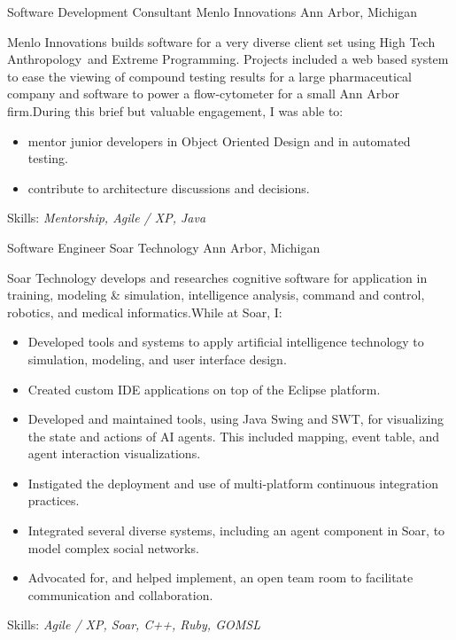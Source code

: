\documentclass[11pt,letterpaper]{moderncv}
\begin{document}
  {Software Development Consultant} {Menlo Innovations} {Ann Arbor, Michigan} {} {%
  Menlo Innovations builds software for a very diverse client set using High
  Tech Anthropology\textregistered \ and Extreme Programming.  Projects
  included a web based system to ease the viewing of compound testing results
  for a large pharmaceutical company and software to power a flow-cytometer
  for a small Ann Arbor firm.\newline During this brief but valuable engagement, I
  was able to:
  \begin{itemize}
  \item mentor junior developers in Object Oriented Design and in
    automated testing.
  \item contribute to architecture discussions and decisions.
  \end{itemize}
  Skills: \emph{Mentorship, Agile / XP, Java}
}

 {Software Engineer} {Soar Technology} {Ann Arbor, Michigan} {} {%
  Soar Technology develops and researches cognitive software for application
  in training, modeling \& simulation, intelligence analysis, command and
  control, robotics, and medical informatics.\newline While at Soar, I:
  \begin{itemize}
  \item Developed tools and systems to apply artificial intelligence
    technology to simulation, modeling, and user interface design.
  \item Created custom IDE applications on top of the Eclipse platform.
  \item Developed and maintained tools, using Java Swing and SWT, for
    visualizing the state and actions of AI agents. This included
    mapping, event table, and agent interaction visualizations.
  \item Instigated the deployment and use of multi-platform
    continuous integration practices.
  \item Integrated several diverse systems, including an agent
    component in Soar, to model complex social networks.
  \item Advocated for, and helped implement, an open team room to
    facilitate communication and collaboration.
  \end{itemize}
  Skills: \emph{Agile / XP, Soar, C++, Ruby, GOMSL}
}
\end{document}
